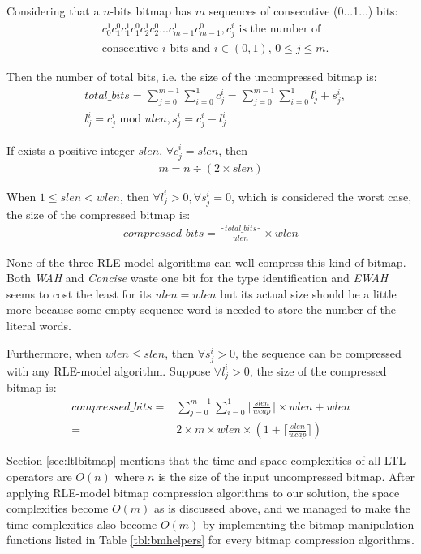 Considering that a $n$-bits bitmap has $m$ sequences of consecutive (0...1...) bits:
\begin{align*}
& c^1_0c^0_1c^1_1c^0_1c^1_2c^0_2...c^1_{m - 1}c^0_{m - 1}, c^i_j \text{ is the number of } \\
& \text{consecutive } i \text{ bits and } i \in (0, 1),\, 0 \leq j \leq m.  
\end{align*}

Then the number of total bits, i.e. the size of the uncompressed bitmap is:
\begin{align*}
& total\_bits = \sum_{j = 0}^{m - 1} \sum_{i = 0}^1 c^i_j = \sum_{j = 0}^{m - 1} \sum_{i = 0}^1 l^i_j + s^i_j, \\
& l^i_j = c^i_j \text{ mod } ulen, s^i_j = c^i_j - l^i_j
\end{align*}

If exists a positive integer $slen$, $\forall c^i_j = slen$, then
\begin{align}
m = n \div (2 \times slen) \label{eq:seqnum}
\end{align}

When $1 \leq slen < wlen$, then $\forall l^i_j > 0, \forall s^i_j = 0$, which is considered the worst case, the size of the compressed bitmap is:
\begin{align*}
compressed\_bits = \lceil \frac{total\_bits}{ulen} \rceil \times wlen 
\end{align*}

None of the three RLE-model algorithms can well compress this kind of bitmap. Both \emph{WAH} and \emph{Concise} waste one bit for the type identification and \emph{EWAH} seems to cost the least for its $ulen = wlen$ but its actual size should be a little more because some empty sequence word is needed to store the number of the literal words.

Furthermore, when $wlen \leq slen$, then $\forall s^i_j > 0$, the sequence can be compressed with any RLE-model algorithm. Suppose $\forall l^i_j > 0$, the size of the compressed bitmap is:
\begin{align*}
compressed\_bits = &\sum_{j = 0}^{m - 1} \sum_{i = 0}^1 \lceil \frac{slen}{wcap} \rceil \times wlen + wlen \\
= & 2 \times m \times wlen \times (1 + \lceil \frac{slen}{wcap} \rceil)
\end{align*}

Section \ref{sec:ltlbitmap} mentions that the time and space complexities of all LTL operators are $O(n)$ where $n$ is the size of the input uncompressed bitmap. After applying RLE-model bitmap compression algorithms to our solution, the space complexities become $O(m)$ as is discussed above, and we managed to make the time complexities also become $O(m)$ by implementing the bitmap manipulation functions listed in Table \ref{tbl:bmhelpers} for every  bitmap compression algorithms.

